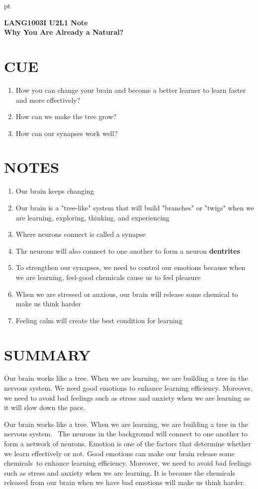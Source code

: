 \documentclass[12pt]{article}
\begin{document}
 pt
\begin{center}
{\bf \Large LANG1003I U2L1 Note\\Why You Are Already a Natural?}
\end{center}
\vspace{0.3cm}

\section{CUE}
\begin{enumerate}
    \item How you can change your brain and become a better learner to learn faster and more effectively?
    \item How can we make the tree grow?
    \item How can our synapses work well?
\end{enumerate}


\section{NOTES}
\begin{enumerate}
    \item Our brain keeps changing
    \item Our brain is a "tree-like" system that will build "branches" or "twigs" when we are learning, exploring, thinking, and experiencing 
    \item Where neurons connect is called a synapse
    \item Thr neurons will also connect to one another to form a neuron \textbf{dentrites}
    \item To strengthen our synapses, we need to control our emotions because when we are learning, feel-good chemicals cause us to feel pleasure
    \item When we are stressed or anxious, our brain will release some chemical to make us think harder
    \item Feeling calm will create the best condition for learning
\end{enumerate}
\section{SUMMARY}
Our brain works like a tree. When we are learning, we are building a tree in the nervous system. We need good emotions to enhance learning efficiency. Moreover, we need to avoid bad feelings such as stress and anxiety when we are learning as it will slow down the pace.

Our brain works like a tree. When we are learning, we are building a tree in the nervous system.  The neurons in the background will connect to one another to form a network of neurons. Emotion is one of the factors that determine whether we learn effectively or not. Good emotions can make our brain release some chemicals to enhance learning efficiency. Moreover, we need to avoid bad feelings such as stress and anxiety when we are learning. It is because the chemicals released from our brain when we have bad emotions will make us think harder.
\end{document}
